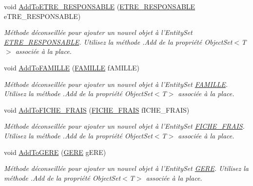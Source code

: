 \begin{DoxyCompactItemize}
void \hyperlink{class_model_1_1_b_d_d___s_i_o7_entities_a38c07ac029787f240fae431e141c2a65}{Add\-To\-E\-T\-R\-E\-\_\-\-R\-E\-S\-P\-O\-N\-S\-A\-B\-L\-E} (\hyperlink{class_model_1_1_e_t_r_e___r_e_s_p_o_n_s_a_b_l_e}{E\-T\-R\-E\-\_\-\-R\-E\-S\-P\-O\-N\-S\-A\-B\-L\-E} e\-T\-R\-E\-\_\-\-R\-E\-S\-P\-O\-N\-S\-A\-B\-L\-E)
\begin{DoxyCompactList}\small\item\em Méthode déconseillée pour ajouter un nouvel objet à l'Entity\-Set \hyperlink{class_model_1_1_e_t_r_e___r_e_s_p_o_n_s_a_b_l_e}{E\-T\-R\-E\-\_\-\-R\-E\-S\-P\-O\-N\-S\-A\-B\-L\-E}. Utilisez la méthode .Add de la propriété Object\-Set$<$T$>$ associée à la place. \end{DoxyCompactList}\item 
void \hyperlink{class_model_1_1_b_d_d___s_i_o7_entities_a68959da31b94dcaf686dd59b14d7f100}{Add\-To\-F\-A\-M\-I\-L\-L\-E} (\hyperlink{class_model_1_1_f_a_m_i_l_l_e}{F\-A\-M\-I\-L\-L\-E} f\-A\-M\-I\-L\-L\-E)
\begin{DoxyCompactList}\small\item\em Méthode déconseillée pour ajouter un nouvel objet à l'Entity\-Set \hyperlink{class_model_1_1_f_a_m_i_l_l_e}{F\-A\-M\-I\-L\-L\-E}. Utilisez la méthode .Add de la propriété Object\-Set$<$T$>$ associée à la place. \end{DoxyCompactList}\item 
void \hyperlink{class_model_1_1_b_d_d___s_i_o7_entities_a65054ac207f1923a158130403d84a28c}{Add\-To\-F\-I\-C\-H\-E\-\_\-\-F\-R\-A\-I\-S} (\hyperlink{class_model_1_1_f_i_c_h_e___f_r_a_i_s}{F\-I\-C\-H\-E\-\_\-\-F\-R\-A\-I\-S} f\-I\-C\-H\-E\-\_\-\-F\-R\-A\-I\-S)
\begin{DoxyCompactList}\small\item\em Méthode déconseillée pour ajouter un nouvel objet à l'Entity\-Set \hyperlink{class_model_1_1_f_i_c_h_e___f_r_a_i_s}{F\-I\-C\-H\-E\-\_\-\-F\-R\-A\-I\-S}. Utilisez la méthode .Add de la propriété Object\-Set$<$T$>$ associée à la place. \end{DoxyCompactList}\item 
void \hyperlink{class_model_1_1_b_d_d___s_i_o7_entities_a9e312e83af4743475e872fb79645bd73}{Add\-To\-G\-E\-R\-E} (\hyperlink{class_model_1_1_g_e_r_e}{G\-E\-R\-E} g\-E\-R\-E)
\begin{DoxyCompactList}\small\item\em Méthode déconseillée pour ajouter un nouvel objet à l'Entity\-Set \hyperlink{class_model_1_1_g_e_r_e}{G\-E\-R\-E}. Utilisez la méthode .Add de la propriété Object\-Set$<$T$>$ associée à la place. \end{DoxyCompactList}\item 

\end{DoxyCompactItemize}
